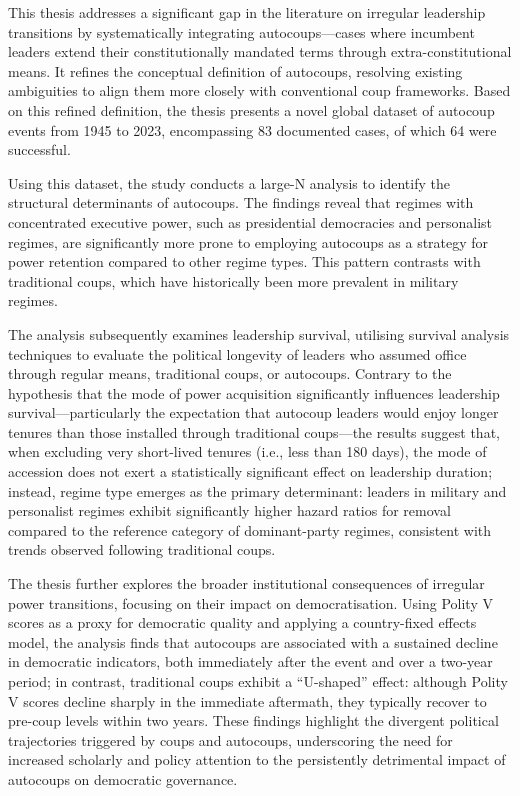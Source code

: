 \documentclass[
  12pt,
]{report}
\begin{document}
This thesis addresses a significant gap in the literature on irregular
leadership transitions by systematically integrating autocoups---cases
where incumbent leaders extend their constitutionally mandated terms
through extra-constitutional means. It refines the conceptual definition
of autocoups, resolving existing ambiguities to align them more closely
with conventional coup frameworks. Based on this refined definition, the
thesis presents a novel global dataset of autocoup events from 1945 to
2023, encompassing 83 documented cases, of which 64 were successful.

Using this dataset, the study conducts a large-N analysis to identify
the structural determinants of autocoups. The findings reveal that
regimes with concentrated executive power, such as presidential
democracies and personalist regimes, are significantly more prone to
employing autocoups as a strategy for power retention compared to other
regime types. This pattern contrasts with traditional coups, which have
historically been more prevalent in military regimes.

The analysis subsequently examines leadership survival, utilising
survival analysis techniques to evaluate the political longevity of
leaders who assumed office through regular means, traditional coups, or
autocoups. Contrary to the hypothesis that the mode of power acquisition
significantly influences leadership survival---particularly the
expectation that autocoup leaders would enjoy longer tenures than those
installed through traditional coups---the results suggest that, when
excluding very short-lived tenures (i.e., less than 180 days), the mode
of accession does not exert a statistically significant effect on
leadership duration; instead, regime type emerges as the primary
determinant: leaders in military and personalist regimes exhibit
significantly higher hazard ratios for removal compared to the reference
category of dominant-party regimes, consistent with trends observed
following traditional coups.

The thesis further explores the broader institutional consequences of
irregular power transitions, focusing on their impact on
democratisation. Using Polity V scores as a proxy for democratic quality
and applying a country-fixed effects model, the analysis finds that
autocoups are associated with a sustained decline in democratic
indicators, both immediately after the event and over a two-year period;
in contrast, traditional coups exhibit a ``U-shaped'' effect: although
Polity V scores decline sharply in the immediate aftermath, they
typically recover to pre-coup levels within two years. These findings
highlight the divergent political trajectories triggered by coups and
autocoups, underscoring the need for increased scholarly and policy
attention to the persistently detrimental impact of autocoups on
democratic governance.
\end{document}
